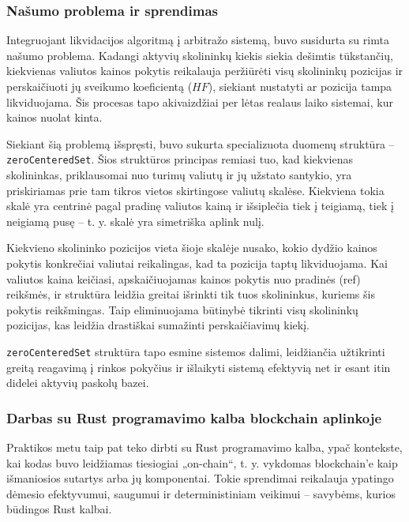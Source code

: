 \documentclass[]{VUMIFTemplateClass}
\begin{document}
\subsubsection{Našumo problema ir sprendimas}

Integruojant likvidacijos algoritmą į arbitražo sistemą, buvo susidurta su rimta našumo problema. Kadangi aktyvių skolininkų kiekis siekia dešimtis tūkstančių, kiekvienas valiutos kainos pokytis reikalauja peržiūrėti visų skolininkų pozicijas ir perskaičiuoti jų sveikumo koeficientą ($HF$), siekiant nustatyti ar pozicija tampa likviduojama. Šis procesas tapo akivaizdžiai per lėtas realaus laiko sistemai, kur kainos nuolat kinta.

Siekiant šią problemą išspręsti, buvo sukurta specializuota duomenų struktūra – \texttt{zeroCenteredSet}. Šios struktūros principas remiasi tuo, kad kiekvienas skolininkas, priklausomai nuo turimų valiutų ir jų užstato santykio, yra priskiriamas prie tam tikros vietos skirtingose valiutų skalėse. Kiekviena tokia skalė yra centrinė pagal pradinę valiutos kainą ir išsiplečia tiek į teigiamą, tiek į neigiamą pusę – t. y. skalė yra simetriška aplink nulį.

Kiekvieno skolininko pozicijos vieta šioje skalėje nusako, kokio dydžio kainos pokytis konkrečiai valiutai reikalingas, kad ta pozicija taptų likviduojama. Kai valiutos kaina keičiasi, apskaičiuojamas kainos pokytis nuo pradinės (ref) reikšmės, ir struktūra leidžia greitai išrinkti tik tuos skolininkus, kuriems šis pokytis reikšmingas. Taip eliminuojama būtinybė tikrinti visų skolininkų pozicijas, kas leidžia drastiškai sumažinti perskaičiavimų kiekį.

\texttt{zeroCenteredSet} struktūra tapo esmine sistemos dalimi, leidžiančia užtikrinti greitą reagavimą į rinkos pokyčius ir išlaikyti sistemą efektyvią net ir esant itin didelei aktyvių paskolų bazei.

\subsubsection{Darbas su Rust programavimo kalba blockchain aplinkoje}

Praktikos metu taip pat teko dirbti su Rust programavimo kalba, ypač kontekste, kai kodas buvo leidžiamas tiesiogiai „on-chain“, t. y. vykdomas blockchain'e kaip išmaniosios sutartys arba jų komponentai. Tokie sprendimai reikalauja ypatingo dėmesio efektyvumui, saugumui ir deterministiniam veikimui – savybėms, kurios būdingos Rust kalbai.
\end{document}
